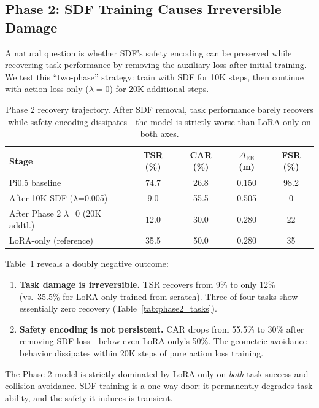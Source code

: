 \documentclass[letterpaper]{article}
\begin{document}
\subsection{Phase 2: SDF Training Causes Irreversible Damage}
\label{sec:exp_phase2}

A natural question is whether SDF's safety encoding can be preserved while recovering task performance by removing the auxiliary loss after initial training. We test this ``two-phase'' strategy: train with SDF for 10K steps, then continue with action loss only ($\lambda=0$) for 20K additional steps.

\begin{table}[t]
\centering
\caption{Phase 2 recovery trajectory. After SDF removal, task performance barely recovers while safety encoding dissipates---the model is strictly worse than LoRA-only on both axes.}
\label{tab:phase2}
\begin{tabular}{lcccc}
\toprule
Stage & TSR (\%) & CAR (\%) & $\Delta_{\text{EE}}$ (m) & FSR (\%) \\
\midrule
Pi0.5 baseline & 74.7 & 26.8 & 0.150 & 98.2 \\
After 10K SDF ($\lambda$=0.005) & 9.0 & 55.5 & 0.505 & 0 \\
After Phase 2 $\lambda$=0 (20K addtl.) & 12.0 & 30.0 & 0.280 & 22 \\
LoRA-only (reference) & 35.5 & 50.0 & 0.280 & 35 \\
\bottomrule
\end{tabular}
\end{table}

Table~\ref{tab:phase2} reveals a doubly negative outcome:
\begin{enumerate}
    \item \textbf{Task damage is irreversible.} TSR recovers from 9\% to only 12\% (vs.\ 35.5\% for LoRA-only trained from scratch). Three of four tasks show essentially zero recovery (Table~\ref{tab:phase2_tasks}).
    \item \textbf{Safety encoding is not persistent.} CAR drops from 55.5\% to 30\% after removing SDF loss---below even LoRA-only's 50\%. The geometric avoidance behavior dissipates within 20K steps of pure action loss training.
\end{enumerate}

The Phase 2 model is strictly dominated by LoRA-only on \emph{both} task success and collision avoidance. SDF training is a one-way door: it permanently degrades task ability, and the safety it induces is transient.
\end{document}
